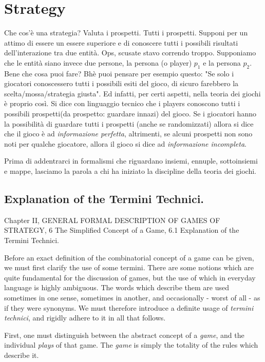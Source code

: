\chapter{Strategy}
Che cos'\`e una strategia? Valuta i prospetti. Tutti i prospetti. Supponi per un attimo di essere un essere superiore e di conoscere tutti i possibili risultati dell'interazione tra due entit\`a. Ops, scusate stavo correndo troppo. Supponiamo che le entit\`a siano invece due persone, la persona (o player) $p_1$ e la persona $p_2$.
Bene che cosa puoi fare? Bh\`e puoi pensare per esempio questo: "Se solo i giocatori conoscessero tutti i possibili esiti del gioco, di sicuro farebbero la scelta/mossa/strategia giusta". Ed infatti, per certi aspetti, nella teoria dei giochi \`e proprio cos\`i. Si dice con linguaggio tecnico che i players conoscono tutti i possibili prospetti(da prospetto: guardare innazi) del gioco. Se i giocatori hanno la possibilit\`a di guardare tutti i prospetti (anche se randomizzati) allora si dice che il gioco \`e ad \emph{informazione perfetta}, altrimenti, se alcuni prospetti non sono noti per qualche giocatore, allora il gioco si dice ad \emph{informazione incompleta}.  

Prima di addentrarci in formalismi che riguardano insiemi, ennuple, sottoinsiemi e mappe, lasciamo la parola a chi ha iniziato la discipline della teoria dei giochi.

\section{Explanation of the Termini Technici. \cite{vonNeumann1944}}
Chapter II, GENERAL FORMAL DESCRIPTION OF GAMES OF STRATEGY, 6 The Simplified Concept of a Game, 6.1 Explanation of the Termini Technici.

Before an exact definition of the combinatorial concept of a game can be given, we must first clarify the use of some termini. There are some notions which are quite fundamental for the discussion of games, but the use of which in everyday language is highly ambiguous. The words which describe them are used sometimes in one sense, sometimes in another, and occasionally - worst of all - as if they were synonyms. We must therefore introduce a definite usage of \emph{termini technici}, and rigidly adhere to it in all that follows.

First, one must distinguish between the abstract concept of a \emph{game}, and the individual \emph{plays} of that game. The \emph{game} is simply the totality of the rules which describe it.

